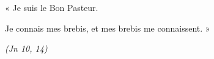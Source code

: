 « Je suis le Bon Pasteur.\par
Je connais mes brebis, et mes brebis me connaissent. »\par
\hspace{4cm}\textit{(Jn 10, 14)}